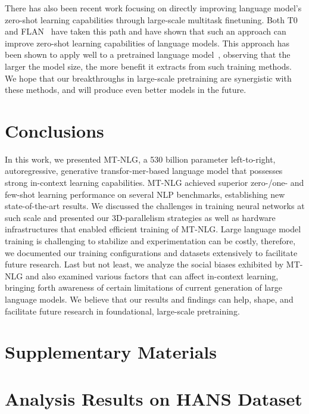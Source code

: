 \documentclass[11pt]{article}
\newcommand{\ours}{MT-NLG}
\begin{document}
There has also been recent work focusing on directly improving language model's zero-shot learning capabilities through large-scale multitask finetuning. Both T0~\citep{Sanh2021MultitaskPT} and FLAN~\citep{Wei2021FinetunedLM} have taken this path and have shown that such an approach can improve zero-shot learning capabilities of language models. This approach has been shown to apply well to a pretrained language model~\citep{Wei2021FinetunedLM}, observing that the larger the model size, the more benefit it extracts from such training methods. We hope that our breakthroughs in large-scale pretraining are synergistic with these methods, and will produce even better models in the future.




\section{Conclusions}
In this work, we presented {\ours}, a 530 billion parameter left-to-right, autoregressive, generative transfor-mer-based language model that possesses strong in-context learning capabilities. {\ours} achieved superior zero-/one- and few-shot learning performance on several NLP benchmarks, establishing new state-of-the-art results. We discussed the challenges in training neural networks at such scale and presented our 3D-parallelism strategies as well as hardware infrastructures that enabled efficient training of {\ours}. Large language model training is challenging to stabilize and experimentation can be costly, therefore, we documented our training configurations and datasets extensively to facilitate future research. Last but not least, we analyze the social biases exhibited by {\ours} and also examined various factors that can affect in-context learning, bringing forth awareness of certain limitations of current generation of large language models. We believe that our results and findings can help, shape, and facilitate future research in foundational, large-scale pretraining.




\FloatBarrier

\appendix

\section*{Supplementary Materials}

\section{Analysis Results on HANS Dataset}\label{sec:hans_appendix}
\end{document}
